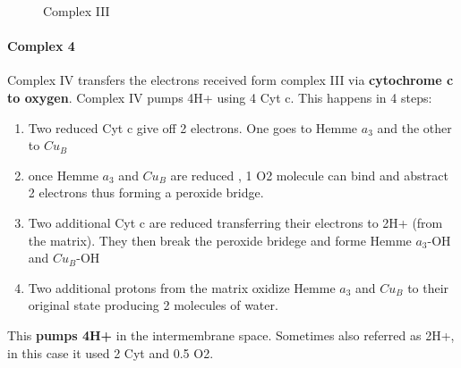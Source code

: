 \documentclass[../main.tex]{subfiles}
\begin{document}
\begin{figure}[H]
	\centering
	\hfil
	\caption{Complex III}
\end{figure}

\paragraph{Complex 4}
Complex IV transfers the electrons received form complex III via \textbf{cytochrome c to oxygen}. Complex IV pumps 4H+ using 4 Cyt c. This happens in 4 steps: 
\begin{enumerate}
	\item Two reduced Cyt c give off 2 electrons. One goes to Hemme $a_{3}$ and the other to $Cu_{B}$
	\item once Hemme $a_{3}$ and $Cu_{B}$ are reduced , 1 O2 molecule can bind and abstract 2 electrons thus forming a peroxide bridge.
	\item Two additional Cyt c are reduced transferring their electrons to 2H+ (from the matrix). They then break the peroxide bridege and forme Hemme $a_{3}$-OH and $Cu_{B}$-OH
	\item Two additional protons from the matrix oxidize Hemme $a_{3}$ and $Cu_{B}$ to their original state producing 2 molecules of water. 
\end{enumerate}
\noindent This \textbf{pumps 4H+} in the intermembrane space. Sometimes also referred as 2H+, in this case it used 2 Cyt and 0.5 O2. 
\end{document}
